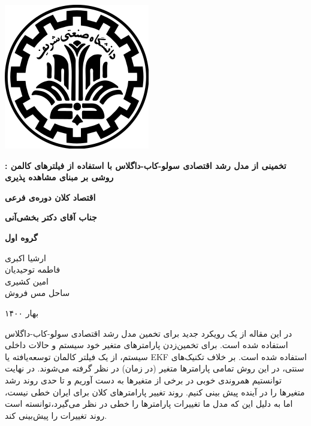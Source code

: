\documentclass[11pt, fleqn]{article}
\begin{document}
\renewcommand\refname{}





\begin{center}

			\vspace{-1cm}
		   \includegraphics[scale=0.35]{Sharif}%
		   \vspace{2cm}

\textbf{
\Huge{
تخمینی از مدل رشد اقتصادی سولو-کاب-داگلاس
با استفاده از فیلتر‌های کالمن
: روشی بر مبنای مشاهده پذیری
}}
\vspace{2cm}

\textbf{
\huge{
اقتصاد کلان دوره‌ی فرعی
}}
\vspace{1mm}

\textbf{
\huge{
جناب آقای دکتر بخشی‌آنی
}}

\vspace{10mm}

\textbf{
\Large{
گروه اول
\\}}
\Large{

ارشیا اکبری
\\
فاطمه توحیدیان
\\
امین کشیری
\\
ساحل مس فروش
}

\vspace{3cm}

\large{
بهار ۱۴۰۰
}
\end{center}


\newpage
{}






\newhline

در این مقاله از یک رویکرد جدید برای تخمین مدل رشد اقتصادی سولو-کاب-داگلاس استفاده شده است. برای تخمین‌زدن پارامتر‌های متغیر خود سیستم و حالات داخلی سیستم، از یک فیلتر کالمان توسعه‌یافته 
 یا
 EKF
 استفاده شده است. بر خلاف تکنیک‌های سنتی، در این روش تمامی پارامتر‌ها متغیر (در زمان) در نظر گرفته می‌شوند. در نهایت توانستیم همروندی خوبی در برخی از متغیر‌ها به دست آوریم و تا حدی روند رشد متغیرها را در آینده پیش بینی کنیم. روند تغییر پارامتر‌های کلان برای ایران خطی نیست، اما به دلیل این که مدل ما تغییرات پارامتر‌ها را خطی در نظر می‌گیرد،توانسته است روند تغییرات را پیش‌بینی کند.
 
\end{document}
